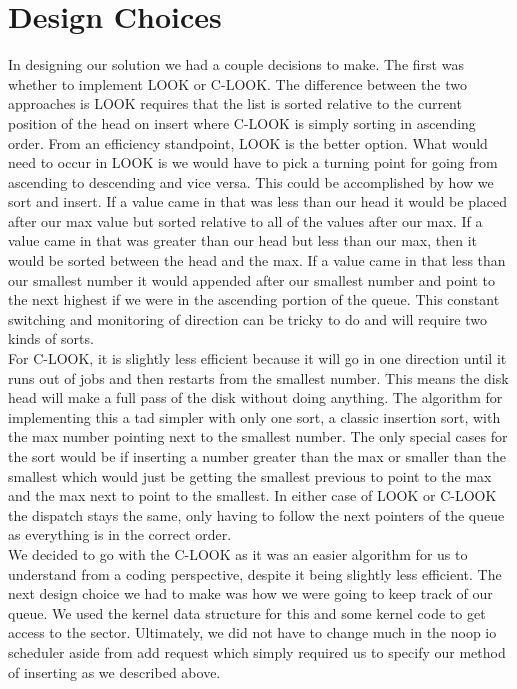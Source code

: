 \documentclass[letterpaper,10pt,serif,draftclsnofoot,onecolumn,compsoc,titlepage]{IEEEtran}
\begin{document}
\section{Design Choices}
In designing our solution we had a couple decisions to make. The first was 
whether to implement LOOK or C-LOOK. The difference between the two 
approaches is LOOK requires that the list is sorted relative to the current 
position of the head on insert where C-LOOK is simply sorting in ascending 
order. From an efficiency standpoint, LOOK is the better option. What 
would need to occur in LOOK is we would have to pick a turning point for 
going from ascending to descending and vice versa. This could be 
accomplished by how we sort and insert. If a value came in that was less
than our head it would be placed after our max value but sorted relative to
all of the values after our max. If a value came in that was greater than 
our head but less than our max, then it would be sorted between the head 
and the max. If a value came in that less than our smallest number it would 
appended after our smallest number and point to the next highest if 
we were in the ascending portion of the queue. This constant switching 
and monitoring of direction can be tricky to do and will require two kinds 
of sorts. \\
For C-LOOK, it is slightly less efficient because it will go in one 
direction until it runs out of jobs and then restarts from the smallest 
number. This means the disk head will make a full pass of the disk without 
doing anything. The algorithm for implementing this a tad simpler with only 
one sort, a classic insertion sort, with the max number pointing next to 
the smallest number. The only special cases for the sort would be if 
inserting a number greater than the max or smaller than the smallest which 
would just be getting the smallest previous to point to the max and the 
max next to point to the smallest. In either case of LOOK or C-LOOK the 
dispatch stays the same, only having to follow the next pointers of the 
queue as everything is in the correct order. \\
We decided to go with the C-LOOK as it was an easier algorithm for us to 
understand from a coding perspective, despite it being slightly less 
efficient. The next design choice we had to make was how we were going 
to keep track of our queue. We used the kernel data structure for this and 
some kernel code to get access to the sector. Ultimately, we did not have 
to change much in the noop io scheduler aside from add request which simply 
required us to specify our method of inserting as we described above. 
\end{document}

